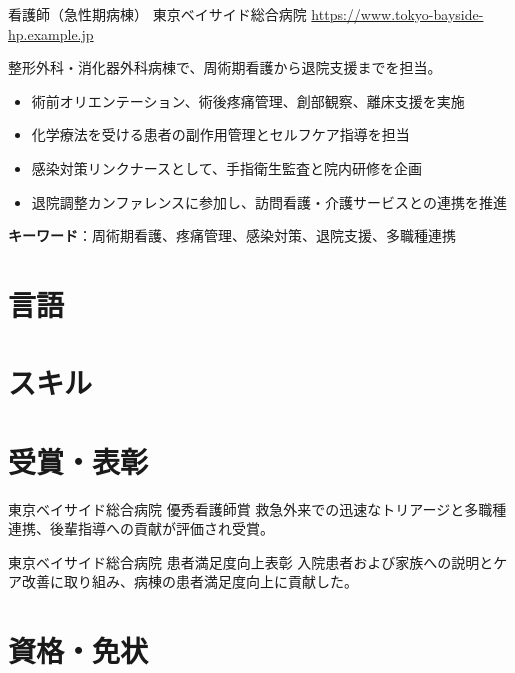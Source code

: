 \documentclass[a4paper, serif, 10pt]{moderncv}
\begin{document}
        {看護師（急性期病棟）}
        {東京ベイサイド総合病院}
        {\url{https://www.tokyo-bayside-hp.example.jp}}
        {}
        {整形外科・消化器外科病棟で、周術期看護から退院支援までを担当。
%
\begin{itemize}
\item 術前オリエンテーション、術後疼痛管理、創部観察、離床支援を実施
\item 化学療法を受ける患者の副作用管理とセルフケア指導を担当
\item 感染対策リンクナースとして、手指衛生監査と院内研修を企画
\item 退院調整カンファレンスに参加し、訪問看護・介護サービスとの連携を推進
\end{itemize}
\textbf{キーワード}：周術期看護、疼痛管理、感染対策、退院支援、多職種連携}
\section{言語}

\section{スキル}

\section{受賞・表彰}

        {東京ベイサイド総合病院}
        {優秀看護師賞}
        {}
        {}
        {救急外来での迅速なトリアージと多職種連携、後輩指導への貢献が評価され受賞。}

        {東京ベイサイド総合病院}
        {患者満足度向上表彰}
        {}
        {}
        {入院患者および家族への説明とケア改善に取り組み、病棟の患者満足度向上に貢献した。}
\section{資格・免状}
\end{document}
